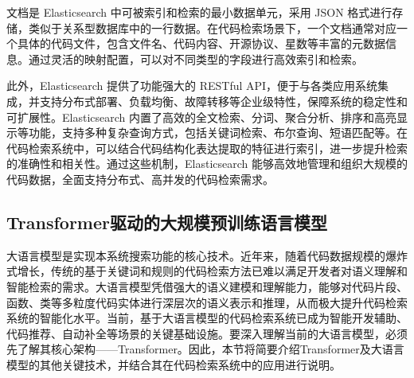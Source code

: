 \documentclass[UTF8,a4paper,12pt]{ctexart}
\numberwithin{equation}{section}
\begin{document}
文档是 Elasticsearch 中可被索引和检索的最小数据单元，采用 JSON 格式进行存储，类似于关系型数据库中的一行数据。在代码检索场景下，一个文档通常对应一个具体的代码文件，包含文件名、代码内容、开源协议、星数等丰富的元数据信息。通过灵活的映射配置，可以对不同类型的字段进行高效索引和检索。\par

此外，Elasticsearch 提供了功能强大的 RESTful API\cite{ref13.9}，便于与各类应用系统集成，并支持分布式部署、负载均衡、故障转移等企业级特性，保障系统的稳定性和可扩展性。Elasticsearch 内置了高效的全文检索、分词、聚合分析、排序和高亮显示等功能，支持多种复杂查询方式，包括关键词检索、布尔查询、短语匹配等。在代码检索系统中，可以结合代码结构化表达提取的特征进行索引，进一步提升检索的准确性和相关性。通过这些机制，Elasticsearch 能够高效地管理和组织大规模的代码数据，全面支持分布式、高并发的代码检索需求。\par
\subsection{Transformer驱动的大规模预训练语言模型}
大语言模型是实现本系统搜索功能的核心技术。近年来，随着代码数据规模的爆炸式增长，传统的基于关键词和规则的代码检索方法已难以满足开发者对语义理解和智能检索的需求。大语言模型凭借强大的语义建模和理解能力，能够对代码片段、函数、类等多粒度代码实体进行深层次的语义表示和推理，从而极大提升代码检索系统的智能化水平。当前，基于大语言模型的代码检索系统已成为智能开发辅助、代码推荐、自动补全等场景的关键基础设施。要深入理解当前的大语言模型，必须先了解其核心架构——Transformer。因此，本节将简要介绍Transformer及大语言模型的其他关键技术，并结合其在代码检索系统中的应用进行说明。
\end{document}
